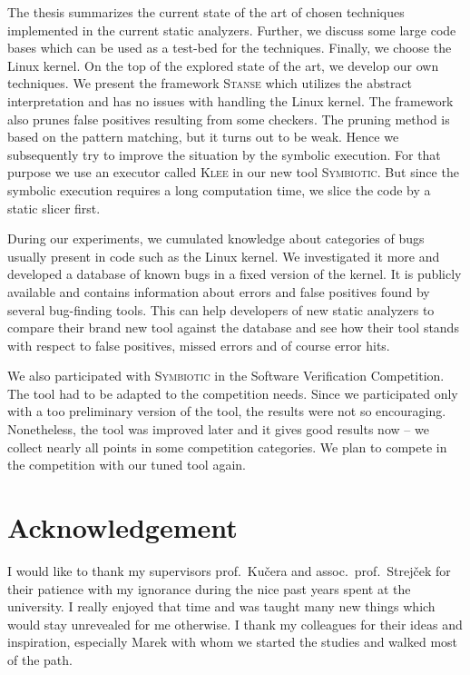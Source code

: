 \documentclass[11pt,a4paper]{book}
\newcommand{\klee}{\textsc{Klee}\xspace}
\newcommand{\stan}{\textsc{Stanse}\xspace}
\newcommand{\symbio}{\textsc{Symbiotic}\xspace}
\begin{document}
The thesis summarizes the current state of the art of chosen techniques
implemented in the current static analyzers. Further, we discuss some large
code bases which can be used as a test-bed for the techniques. Finally, we
choose the Linux kernel. On the top of the explored state of the art, we
develop our own techniques. We present the framework \stan which utilizes the
abstract interpretation and has no issues with handling the Linux kernel. The
framework also prunes false positives resulting from some checkers. The
pruning method is based on the pattern matching, but it turns out to be weak.
Hence we subsequently try to improve the situation by the symbolic execution.
For that purpose we use an executor called \klee in our new tool \symbio. But
since the symbolic execution requires a long computation time, we slice the
code by a static slicer first.

During our experiments, we cumulated knowledge about categories of bugs
usually present in code such as the Linux kernel. We investigated it more and
developed a database of known bugs in a fixed version of the kernel. It is
publicly available and contains information about errors and false positives
found by several bug-finding tools. This can help developers of new static
analyzers to compare their brand new tool against the database and see how
their tool stands with respect to false positives, missed errors and of
course error hits.

We also participated with \symbio in the Software Verification Competition.
The tool had to be adapted to the competition needs.  Since we participated
only with a too preliminary version of the tool, the results were not so
encouraging.  Nonetheless, the tool was improved later and it gives
good results now -- we collect nearly all points in some competition
categories.  We plan to compete in the competition with our tuned tool again.

\chapter*{Acknowledgement}
I would like to thank my supervisors prof.\ Kučera and assoc.\ prof.\
Strejček for their patience with my ignorance during the nice past years spent
at the university. I really enjoyed that time and was taught many new things
which would stay unrevealed for me otherwise. I thank my colleagues for their
ideas and inspiration, especially Marek with whom we started the studies and
walked most of the path.
\end{document}
